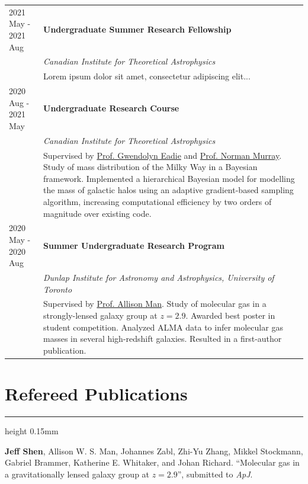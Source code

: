 \documentclass[10pt]{article}
\begin{document}
\begin{tabularx}{\textwidth}{lX}
    2021 May - 2021 Aug & \textbf{Undergraduate Summer Research Fellowship} \\
                        & \textit{Canadian Institute for Theoretical Astrophysics} \\
                        & Lorem ipsum dolor sit amet, consectetur adipiscing elit... \\
    2020 Aug - 2021 May & \textbf{Undergraduate Research Course} \\
                        & \textit{Canadian Institute for Theoretical Astrophysics} \\
                        & Supervised by \href{https://www.astro.utoronto.ca/~eadie/intro.html}{Prof. Gwendolyn Eadie} and \href{https://www.cita.utoronto.ca/~murray/}{Prof. Norman Murray}. Study of mass distribution of the Milky Way in a Bayesian framework. Implemented a hierarchical Bayesian model for modelling the mass of galactic halos using an adaptive gradient-based sampling algorithm, increasing computational efficiency by two orders of magnitude over existing code. \\
    2020 May - 2020 Aug & \textbf{Summer Undergraduate Research Program} \\
                        & \textit{Dunlap Institute for Astronomy and Astrophysics, University of Toronto} \\
                        & Supervised by \href{https://phas.ubc.ca/users/allison-man}{Prof. Allison Man}. Study of molecular gas in a strongly-lensed galaxy group at $z=2.9$. Awarded best poster in student competition. Analyzed ALMA data to infer molecular gas masses in several high-redshift galaxies. Resulted in a first-author publication.
\end{tabularx}

\vspace{-2mm}
\section*{Refereed Publications}
\vspace{-1.5mm}
\hrule height 0.15mm
\vspace{2mm}

\begin{etaremune}
\item \textbf{Jeff Shen}, Allison W. S. Man, Johannes Zabl, Zhi-Yu Zhang, Mikkel Stockmann, Gabriel Brammer, Katherine E. Whitaker, and Johan Richard. ``Molecular gas in a gravitationally lensed galaxy group at $z=2.9$'', submitted to \textit{ApJ}.
\end{etaremune}
\end{document}
